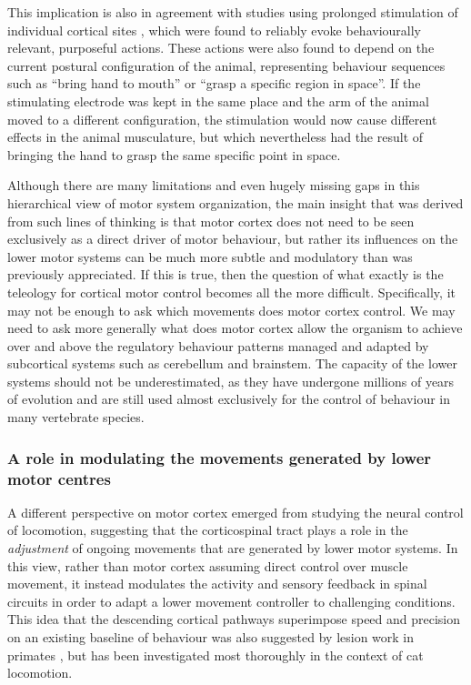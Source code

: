 This implication is also in agreement with studies using prolonged stimulation of individual cortical sites \cite{Ferrier1873,Clark1937}, which were found to reliably evoke behaviourally relevant, purposeful actions. These actions were also found to depend on the current postural configuration of the animal, representing behaviour sequences such as ``bring hand to mouth'' or ``grasp a specific region in space''. If the stimulating electrode was kept in the same place and the arm of the animal moved to a different configuration, the stimulation would now cause different effects in the animal musculature, but which nevertheless had the result of bringing the hand to grasp the same specific point in space.

Although there are many limitations and even hugely missing gaps in this hierarchical view of motor system organization, the main insight that was derived from such lines of thinking is that motor cortex does not need to be seen exclusively as a direct driver of motor behaviour, but rather its influences on the lower motor systems can be much more subtle and modulatory than was previously appreciated. If this is true, then the question of what exactly is the teleology for cortical motor control becomes all the more difficult. Specifically, it may not be enough to ask which movements does motor cortex control. We may need to ask more generally what does motor cortex allow the organism to achieve over and above the regulatory behaviour patterns managed and adapted by subcortical systems such as cerebellum and brainstem. The capacity of the lower systems should not be underestimated, as they have undergone millions of years of evolution and are still used almost exclusively for the control of behaviour in many vertebrate species.

\subsubsection*{A role in modulating the movements generated by lower motor centres}

A different perspective on motor cortex emerged from studying the neural control of locomotion, suggesting that the corticospinal tract plays a role in the \emph{adjustment} of ongoing movements that are generated by lower motor systems. In this view, rather than motor cortex assuming direct control over muscle movement, it instead modulates the activity and sensory feedback in spinal circuits in order to adapt a lower movement controller to challenging conditions. This idea that the descending cortical pathways superimpose speed and precision on an existing baseline of behaviour was also suggested by lesion work in primates \cite{Lawrence1968a}, but has been investigated most thoroughly in the context of cat locomotion.

